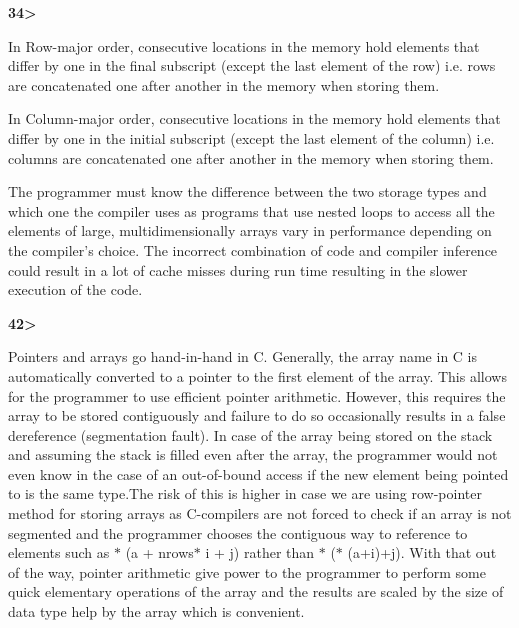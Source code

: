 \documentclass[12pt]{article}
\renewcommand{\_}{\kern-1.5pt\textunderscore\kern-1.5pt}
\begin{document}
\vspace{\baselineskip}
\textbf{34>}\par

In Row-major order, consecutive locations in the memory hold elements that differ by one in the final subscript (except the last element of the row) i.e. rows are concatenated one after another in the memory when storing them.\par

In Column-major order, consecutive locations in the memory hold elements that differ by one in the initial subscript (except the last element of the column) i.e. columns are concatenated one after another in the memory when storing them.\par

The programmer must know the difference between the two storage types and which one the compiler uses as programs that use nested loops to access all the elements of large, multidimensionally arrays vary in performance depending on the compiler's choice. The incorrect combination of code and compiler inference could result in a lot of cache misses during run time resulting in the slower execution of the code.\par


\vspace{\baselineskip}
\textbf{42>}\par

Pointers and arrays go hand-in-hand in C. Generally, the array name in C is automatically converted to a pointer to the first element of the array. This allows for the programmer to use efficient pointer arithmetic. However, this requires the array to be stored contiguously and failure to do so occasionally results in a false dereference (segmentation fault). In case of the array being stored on the stack and assuming the stack is filled even after the array, the programmer would not even know in the case of an out-of-bound access if the new element being pointed to is the same type.The risk of this is higher in case we are using row-pointer method for storing arrays as C-compilers are not forced to check if an array is not segmented and the programmer chooses the contiguous way to reference to elements such as $\ast$ (a + n\_rows$\ast$ i + j) rather than $\ast$ ($\ast$ (a+i)+j). With that out of the way, pointer arithmetic give power to the programmer to perform some quick elementary operations of the array and the results are scaled by the size of data type help by the array which is convenient. \par
\end{document}
